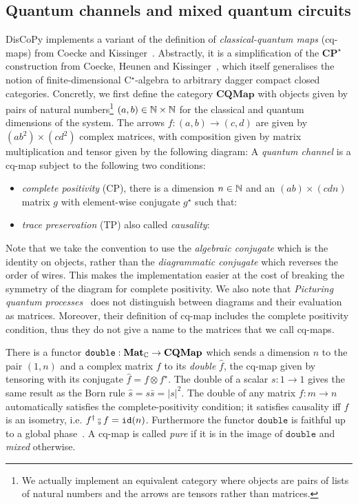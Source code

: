 
\subsection{Quantum channels and mixed quantum circuits}\label{section:mixed-circuits}

DisCoPy implements a variant of the definition of \emph{classical-quantum maps} (cq-maps) from Coecke and Kissinger~\cite[Chapter~8]{CoeckeKissinger17}.
Abstractly, it is a simplification of the $\mathbf{CP^\star}$ construction from Coecke, Heunen and Kissinger~\cite{CoeckeEtAl12}, which itself generalises the notion of finite-dimensional C$^\star$-algebra to arbitrary dagger compact closed categories.
Concretly, we first define the category $\mathbf{CQMap}$ with objects given by pairs of natural numbers\footnote
{We actually implement an equivalent category where objects are pairs of lists of natural numbers and the arrows are tensors rather than matrices.} $(a, b) \in \mathbb{N} \times \mathbb{N}$ for the classical and quantum dimensions of the system.
The arrows $f : (a, b) \to (c, d)$ are given by $(a b^2) \times (c d^2)$ complex matrices, with composition given by matrix multiplication and tensor given by the following diagram:
A \emph{quantum channel} is a cq-map subject to the following two conditions:
\begin{itemize}
\item \emph{complete positivity} (CP), there is a dimension $n \in \mathbb{N}$ and an $(a b) \times (c d n)$ matrix $g$ with element-wise conjugate $g^\star$ such that:
\item \emph{trace preservation} (TP) also called \emph{causality}:
\end{itemize}
Note that we take the convention to use the \emph{algebraic conjugate} which is the identity on objects, rather than the \emph{diagrammatic conjugate} which reverses the order of wires.
This makes the implementation easier at the cost of breaking the symmetry of the diagram for complete positivity.
We also note that \emph{Picturing quantum processes}~\cite{CoeckeKissinger17} does not distinguish between diagrams and their evaluation as matrices.
Moreover, their definition of cq-map includes the complete positivity condition, thus they do not give a name to the matrices that we call cq-maps.

There is a functor $\mathtt{double} : \mathbf{Mat}_{\mathbb{C}} \to \mathbf{CQMap}$ which sends a dimension $n$ to the pair $(1, n)$ and a complex matrix $f$ to its \emph{double} $\widehat{f}$, the cq-map given by tensoring with its conjugate $\widehat{f} = f \otimes f^\star$.
The double of a scalar $s : 1 \to 1$ gives the same result as the Born rule $\hat{s} = s \bar{s} = \vert s \vert^2$.
The double of any matrix $f : m \to n$ automatically satisfies the complete-positivity condition; it satisfies causality iff $f$ is an isometry, i.e. $f^\dagger \fcmp f = \id(n)$.
Furthermore the functor $\mathtt{double}$ is faithful up to a global phase~\cite[Proposition~6.6]{CoeckeKissinger17}.
A cq-map is called \emph{pure} if it is in the image of $\mathtt{double}$ and \emph{mixed} otherwise.

